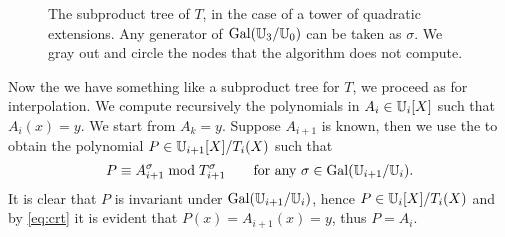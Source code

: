 \begin{figure}[tb]
  \centering
  
  \hfill
  
  \caption{The subproduct tree of $T$, in the case of a tower of
    quadratic extensions. Any generator of $\operatorname{Gal}(\mathbb{U}_3/\mathbb{U}_0)$ can be
    taken as $\sigma$. We gray out and circle the nodes that the
    algorithm does not compute.}
  \label{fig:tree}
\end{figure}


Now the we have something like a subproduct tree for $T$, we proceed
as for interpolation. We compute recursively the polynomials in
$A_i\in\mathbb{U}_i[X]$ such that $A_i(x)=y$. We start from $A_k=y$. Suppose
$A_{i+1}$ is known, then we use the  to
obtain the polynomial $P\in\mathbb{U}_{i+1}[X]/T_i(X)$ such that
\begin{equation}
  \label{eq:crt}
  P \equiv A_{i+1}^\sigma \bmod T_{i+1}^\sigma
  \qquad\text{for any $\sigma\in\operatorname{Gal}(\mathbb{U}_{i+1}/\mathbb{U}_i)$.}
\end{equation}
It is clear that $P$ is invariant under $\operatorname{Gal}(\mathbb{U}_{i+1}/\mathbb{U}_i)$, hence
$P\in\mathbb{U}_i[X]/T_i(X)$ and by \eqref{eq:crt} it is evident that
$P(x)=A_{i+1}(x)=y$, thus $P=A_i$.


